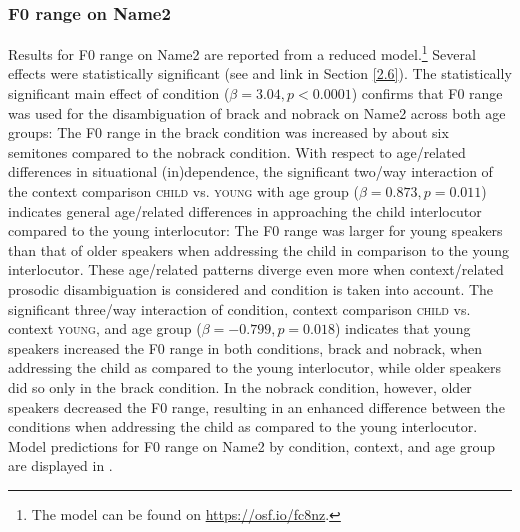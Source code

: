 \documentclass[output=paper]{langscibook}
\begin{document}
\subsubsection{F0 range on Name2}
Results for F0 range on Name2 are reported from a reduced model.\footnote{The model can be found on \href{https://osf.io/fc8nz/?view_only=1974f7d0721049e2be0401c973234518}{https://osf.io/fc8nz}.} Several effects  were statistically significant (see  and link in Section \ref{2.6}). The statistically significant main effect of condition ($\beta = 3.04,\allowbreak p<0.0001$) confirms that F0 range was used for the disambiguation of brack and nobrack on Name2 across both age groups: The F0 range in the brack condition was increased by about six semitones compared to the nobrack condition. With respect to age\-/related differences in situational (in)de\-pen\-dence, the significant two\-/way interaction of the context comparison \textsc{child} vs. \textsc{young} with age group ($\beta = 0.873,\allowbreak p = 0.011$) indicates general age\-/related differences in approaching the child interlocutor compared to the young interlocutor: The F0 range was larger for young speakers than that of older speakers when addressing the child in comparison to the young interlocutor. These age\-/related patterns diverge even more when context\-/related prosodic disambiguation is considered and condition is taken into account. The significant three\-/way interaction of condition, context comparison \textsc{child} vs. context \textsc{young}, and age group ($\beta = -0.799,\allowbreak p = 0.018$) indicates that young speakers increased the F0 range in both conditions, brack and nobrack, when addressing the child as compared to the young interlocutor, while older speakers did so only in the brack condition. In the nobrack condition, however, older speakers decreased the F0 range, resulting in an enhanced difference between the conditions when addressing the child as compared to the young interlocutor. Model predictions for F0 range on Name2 by condition, context, and age group are displayed in . 
\end{document}
